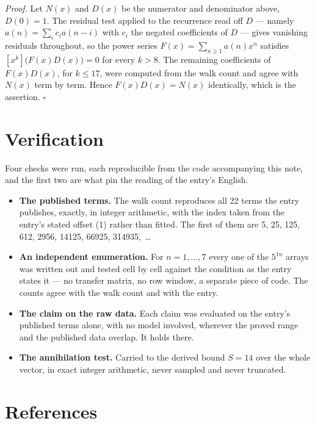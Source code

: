 \documentclass[11pt]{article}
\theoremstyle{definition}
\begin{document}
{\itshape Proof.} Let $N(x)$ and $D(x)$ be the numerator and denominator above, $D(0)=1$. The residual test applied to the recurrence read off $D$ --- namely $a(n) = \sum_i c_i a(n-i)$ with $c_i$ the negated coefficients of $D$ --- gives vanishing residuals throughout, so the power series $F(x)=\sum_{n\ge 1}a(n)x^n$ satisfies $[x^k]\bigl(F(x)D(x)\bigr) = 0$ for every $k > 8$. The remaining coefficients of $F(x)D(x)$, for $k \le 17$, were computed from the walk count and agree with $N(x)$ term by term. Hence $F(x)D(x) = N(x)$ identically, which is the assertion. $\square$

\section{Verification}

Four checks were run, each reproducible from the code accompanying this note, and the first two are what pin the reading of the entry's English.

\begin{itemize}

\item {\bfseries The published terms.} The walk count reproduces all 22 terms the entry publishes, exactly, in integer arithmetic, with the index taken from the entry's stated offset (1) rather than fitted. The first of them are 5, 25, 125, 612, 2956, 14125, 66925, 314935,~\dots

\item {\bfseries An independent enumeration.} For $n = 1,\dots,7$ every one of the $5^{1n}$ arrays was written out and tested cell by cell against the condition as the entry states it --- no transfer matrix, no row window, a separate piece of code. The counts agree with the walk count and with the entry.

\item {\bfseries The claim on the raw data.} Each claim was evaluated on the entry's published terms alone, with no model involved, wherever the proved range and the published data overlap. It holds there.

\item {\bfseries The annihilation test.} Carried to the derived bound $S = 14$ over the whole vector, in exact integer arithmetic, never sampled and never truncated.

\end{itemize}

\section{References}
\end{document}
